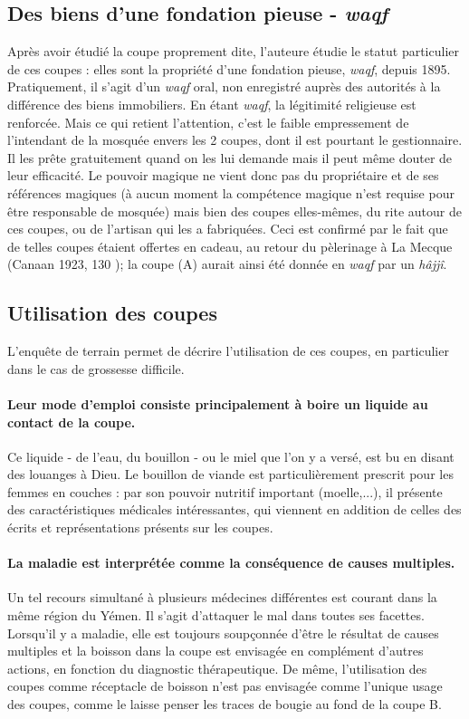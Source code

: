 \subsection*{Des biens d'une fondation pieuse - \textit{waqf}}
Après avoir étudié la coupe proprement dite, l'auteure étudie le statut particulier de ces coupes : elles sont la propriété d'une fondation pieuse, \textit{waqf}, depuis 1895. Pratiquement, il s'agit d'un \textit{waqf} oral, non enregistré auprès des autorités à la différence des biens immobiliers.
En étant \textit{waqf}, la légitimité religieuse est
renforcée. 
Mais ce qui retient l'attention, c'est le faible empressement de l'intendant de la mosquée envers les 2 coupes, dont il est pourtant le gestionnaire. Il les prête gratuitement quand on les lui demande mais il peut même douter de leur efficacité. Le pouvoir magique ne vient donc pas du propriétaire et de ses références magiques (à aucun moment la compétence magique n'est requise pour être responsable de mosquée) mais bien des coupes elles-mêmes,  du rite autour de ces coupes, ou de l'artisan qui les a fabriquées. Ceci est confirmé par le fait que de telles coupes étaient offertes en cadeau, au retour du pèlerinage à La Mecque (Canaan 1923, 130 \cite[note 63]{Regourd_2007}); la coupe (A) aurait ainsi été donnée en \textit{waqf} par un \textit{hâjjî}.

\subsection*{Utilisation des coupes}
L'enquête de terrain permet de décrire l'utilisation de ces coupes, en particulier dans le cas de grossesse difficile. 

\paragraph{Leur mode d’emploi consiste principalement à boire un liquide au contact de la coupe.}  Ce liquide - de
l’eau, du bouillon - ou le miel que l’on y a versé, est bu en disant des louanges à Dieu.
Le bouillon de viande est particulièrement prescrit pour les femmes en couches : par son pouvoir nutritif important (moelle,...), il présente des caractéristiques médicales intéressantes,  qui
viennent en addition de celles des écrits et représentations présents sur les coupes. 
\paragraph{La maladie est interprétée comme la conséquence de causes multiples.} Un tel recours simultané à plusieurs médecines différentes est courant dans la même région du Yémen. Il s'agit d'attaquer le mal dans toutes ses facettes. Lorsqu’il y a maladie,
elle est toujours soupçonnée d’être le résultat de causes multiples et la boisson dans la coupe est envisagée en complément d'autres actions, en fonction du diagnostic thérapeutique. De même, l’utilisation des coupes comme réceptacle de boisson n'est pas envisagée comme l'unique usage des coupes, comme le laisse penser les traces de bougie au fond de la coupe B. 


